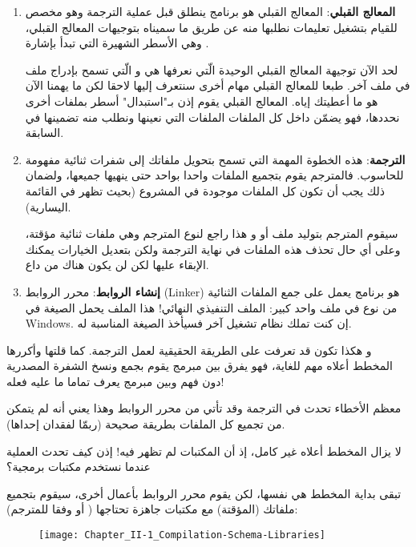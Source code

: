 \begin{enumerate}
  \item \textbf{المعالج القبلي}:
المعالج القبلي هو برنامج ينطلق قبل عملية الترجمة وهو مخصص للقيام بتشغيل تعليمات نطلبها منه عن طريق ما سميناه بتوجيهات المعالج القبلي، وهي الأسطر الشهيرة التي تبدأ بإشارة
\InlineCode{\#}.

لحد الآن توجيهة المعالج القبلي الوحيدة الّتي نعرفها هي
و الّتي تسمح بإدراج ملف في ملف آخر. طبعا للمعالج القبلي مهام أخرى سنتعرف إليها لاحقا لكن ما يهمنا الآن هو ما أعطيتك إياه.
المعالج القبلي يقوم إذن بـ"استبدال" أسطر
بملفات أخرى نحددها، فهو يضمّن داخل كل الملفات
الملفات
التي نعينها ونطلب منه تضمينها في السابقة.
  \item \textbf{الترجمة}: هذه الخطوة المهمة التي تسمح بتحويل ملفاتك إلى شفرات ثنائية مفهومة للحاسوب. فالمترجم يقوم بتجميع الملفات
واحدا بواحد حتى ينهيها جميعها، ولضمان ذلك يجب أن تكون كل الملفات موجودة في المشروع (بحيث تظهر في القائمة اليسارية).

سيقوم المترجم بتوليد ملف
أو
و هذا راجع لنوع المترجم وهي ملفات ثنائية مؤقتة، وعلى أي حال تحذف هذه الملفات في نهاية الترجمة ولكن بتعديل الخيارات يمكنك الإبقاء عليها لكن لن يكون هناك من داع.
  \item \textbf{إنشاء الروابط}:
محرر الروابط
(\textenglish{Linker})
هو برنامج يعمل على جمع الملفات الثنائية من نوع
في ملف واحد كبير: الملف التنفيذي النهائي! هذا الملف يحمل الصيغة
في \textenglish{Windows}. إن كنت تملك نظام تشغيل آخر فسيأخذ الصيغة المناسبة له.
\end{enumerate}

و هكذا تكون قد تعرفت على الطريقة الحقيقية لعمل الترجمة. كما قلتها وأكررها المخطط أعلاه مهم للغاية، فهو يفرق بين مبرمج يقوم بجمع ونسخ الشفرة المصدرية دون فهم وبين مبرمج يعرف تماما ما عليه فعله!

معظم الأخطاء تحدث في الترجمة وقد تأتي من محرر الروابط وهذا يعني أنه لم يتمكن من تجميع كل الملفات
بطريقة صحيحة (ربمّا لفقدان إحداها).

لا يزال المخطط أعلاه غير كامل، إذ أن المكتبات لم تظهر فيه! إذن كيف تحدث العملية عندما نستخدم مكتبات برمجية؟

تبقى بداية المخطط هي نفسها، لكن يقوم محرر الروابط بأعمال أخرى، سيقوم بتجميع ملفاتك
(المؤقتة) مع مكتبات جاهزة تحتاجها 
(
أو
وفقا للمترجم):

\begin{figure}[H]
	\centering
	\texttt{[image: Chapter\_II-1\_Compilation-Schema-Libraries]}
\end{figure}

